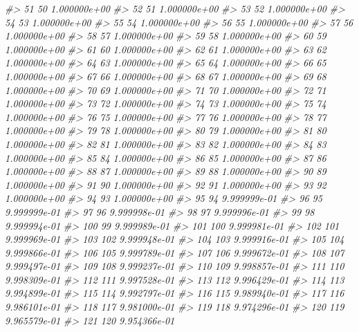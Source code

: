 \documentclass[]{article}
\newenvironment{Shaded}{\begin{snugshade}}{\end{snugshade}}
\newcommand{\CommentTok}[1]{\textcolor[rgb]{0.56,0.35,0.01}{\textit{#1}}}
\begin{document}
\begin{Shaded}
\begin{Highlighting}[]
\CommentTok{#> 51   50 1.000000e+00}
\CommentTok{#> 52   51 1.000000e+00}
\CommentTok{#> 53   52 1.000000e+00}
\CommentTok{#> 54   53 1.000000e+00}
\CommentTok{#> 55   54 1.000000e+00}
\CommentTok{#> 56   55 1.000000e+00}
\CommentTok{#> 57   56 1.000000e+00}
\CommentTok{#> 58   57 1.000000e+00}
\CommentTok{#> 59   58 1.000000e+00}
\CommentTok{#> 60   59 1.000000e+00}
\CommentTok{#> 61   60 1.000000e+00}
\CommentTok{#> 62   61 1.000000e+00}
\CommentTok{#> 63   62 1.000000e+00}
\CommentTok{#> 64   63 1.000000e+00}
\CommentTok{#> 65   64 1.000000e+00}
\CommentTok{#> 66   65 1.000000e+00}
\CommentTok{#> 67   66 1.000000e+00}
\CommentTok{#> 68   67 1.000000e+00}
\CommentTok{#> 69   68 1.000000e+00}
\CommentTok{#> 70   69 1.000000e+00}
\CommentTok{#> 71   70 1.000000e+00}
\CommentTok{#> 72   71 1.000000e+00}
\CommentTok{#> 73   72 1.000000e+00}
\CommentTok{#> 74   73 1.000000e+00}
\CommentTok{#> 75   74 1.000000e+00}
\CommentTok{#> 76   75 1.000000e+00}
\CommentTok{#> 77   76 1.000000e+00}
\CommentTok{#> 78   77 1.000000e+00}
\CommentTok{#> 79   78 1.000000e+00}
\CommentTok{#> 80   79 1.000000e+00}
\CommentTok{#> 81   80 1.000000e+00}
\CommentTok{#> 82   81 1.000000e+00}
\CommentTok{#> 83   82 1.000000e+00}
\CommentTok{#> 84   83 1.000000e+00}
\CommentTok{#> 85   84 1.000000e+00}
\CommentTok{#> 86   85 1.000000e+00}
\CommentTok{#> 87   86 1.000000e+00}
\CommentTok{#> 88   87 1.000000e+00}
\CommentTok{#> 89   88 1.000000e+00}
\CommentTok{#> 90   89 1.000000e+00}
\CommentTok{#> 91   90 1.000000e+00}
\CommentTok{#> 92   91 1.000000e+00}
\CommentTok{#> 93   92 1.000000e+00}
\CommentTok{#> 94   93 1.000000e+00}
\CommentTok{#> 95   94 9.999999e-01}
\CommentTok{#> 96   95 9.999999e-01}
\CommentTok{#> 97   96 9.999998e-01}
\CommentTok{#> 98   97 9.999996e-01}
\CommentTok{#> 99   98 9.999994e-01}
\CommentTok{#> 100  99 9.999989e-01}
\CommentTok{#> 101 100 9.999981e-01}
\CommentTok{#> 102 101 9.999969e-01}
\CommentTok{#> 103 102 9.999948e-01}
\CommentTok{#> 104 103 9.999916e-01}
\CommentTok{#> 105 104 9.999866e-01}
\CommentTok{#> 106 105 9.999789e-01}
\CommentTok{#> 107 106 9.999672e-01}
\CommentTok{#> 108 107 9.999497e-01}
\CommentTok{#> 109 108 9.999237e-01}
\CommentTok{#> 110 109 9.998857e-01}
\CommentTok{#> 111 110 9.998309e-01}
\CommentTok{#> 112 111 9.997528e-01}
\CommentTok{#> 113 112 9.996429e-01}
\CommentTok{#> 114 113 9.994899e-01}
\CommentTok{#> 115 114 9.992797e-01}
\CommentTok{#> 116 115 9.989940e-01}
\CommentTok{#> 117 116 9.986101e-01}
\CommentTok{#> 118 117 9.981000e-01}
\CommentTok{#> 119 118 9.974296e-01}
\CommentTok{#> 120 119 9.965579e-01}
\CommentTok{#> 121 120 9.954366e-01}

\end{Highlighting}
\end{Shaded}
\end{document}
